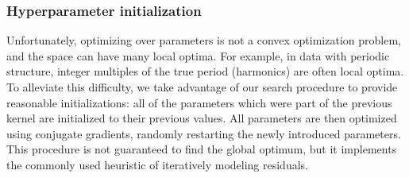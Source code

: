 \subsubsection{Hyperparameter initialization}

Unfortunately, optimizing over parameters is not a convex optimization problem, and the space can have many local optima.
For example, in data with periodic structure, integer multiples of the true period (harmonics) are often local optima. 
%
To alleviate this difficulty, we take advantage of our search procedure to provide reasonable initializations: all of the parameters which were part of the previous kernel are initialized to their previous values.
All parameters are then optimized using conjugate gradients, randomly restarting the newly introduced parameters.
This procedure is not guaranteed to find the global optimum, but it implements the commonly used heuristic of iteratively modeling residuals.


